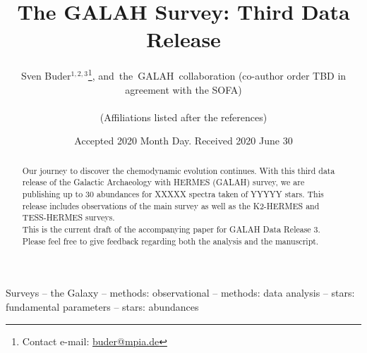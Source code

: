 \documentclass[fleqn,usenatbib,useAMS]{mnras}
\begin{document}
\begin{CJK*}{UTF8}{gbsn}
\label{firstpage}
\pagerange{\pageref{firstpage}--\pageref{lastpage}}


\title{The GALAH Survey: Third Data Release}

\author[Buder et al.]{Sven Buder$^{1,2,3}$\thanks{Contact e-mail: \href{mailto:buder@mpia.de}{buder@mpia.de}},
and~the~GALAH~collaboration \newauthor
(co-author order TBD in agreement with the SOFA)
\\
\\
(Affiliations listed after the references)}

\date{Accepted 2020 Month Day. Received 2020 June 30}


\maketitle
\end{CJK*}

\begin{abstract}
Our journey to discover the chemodynamic evolution continues. With this third data release of the Galactic Archaeology with HERMES (GALAH) survey, we are publishing up to 30 abundances for XXXXX spectra taken of YYYYY stars. This release includes observations of the main survey as well as the K2-HERMES and TESS-HERMES surveys. \\
This is the current draft of the accompanying paper for GALAH Data Release 3. \\
Please feel free to give feedback regarding both the analysis and the manuscript.
%
\end{abstract}

\begin{keywords}
Surveys -- 
the Galaxy --
methods: observational --
methods: data analysis --
stars: fundamental parameters -- 
stars: abundances
\end{keywords}

\end{document}
